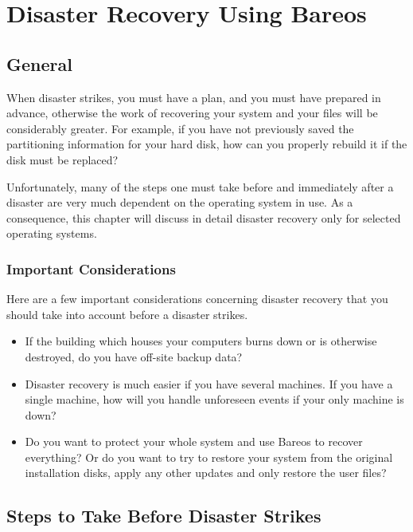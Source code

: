 
\chapter{Disaster Recovery Using Bareos}
\label{RescueChapter}

\section{General}

When disaster strikes, you must have a plan, and you must have prepared in
advance, otherwise the work of recovering your system and your files will be
considerably greater.  For example, if you have not previously saved the
partitioning information for your hard disk, how can you properly rebuild
it if the disk must be replaced?

Unfortunately, many of the steps one must take before and immediately after
a disaster are very much dependent on the operating system in use.  As a
consequence, this chapter will discuss in detail disaster recovery only for selected operating systems.

\subsection{Important Considerations}

Here are a few important considerations concerning disaster recovery that
you should take into account before a disaster strikes.

\begin{itemize}
\item If the building which houses your computers burns down or is otherwise
   destroyed, do you have off-site backup data?
\item Disaster recovery is much easier if you have several machines. If  you
   have a single machine, how will you handle unforeseen events  if your only
   machine is down?
\item Do you want to protect your whole system and use Bareos to  recover
   everything? Or do you want to try to restore your system from  the original
   installation disks, apply any other updates and only restore the user files?
\end{itemize}

\section{Steps to Take Before Disaster Strikes}

